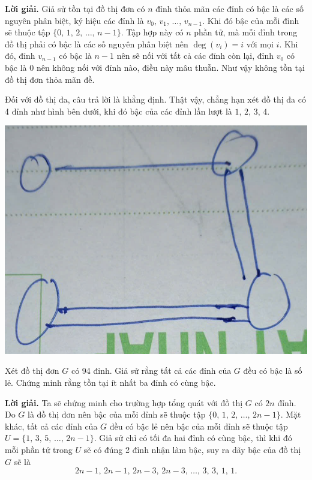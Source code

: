 \textbf{Lời giải. }Giả sử tồn tại đồ thị đơn có $n$ đỉnh thỏa mãn các đỉnh có bậc là các số nguyên phân biệt, ký hiệu các đỉnh là $v_0,\,v_1,\,\ldots,\,v_{n-1}$. Khi đó bậc của mỗi đỉnh sẽ thuộc tập $\{0,\,1,\,2,\,\ldots,\,n-1\}$. Tập hợp này có $n$ phần tử, mà mỗi đỉnh trong đồ thị phải có bậc là các số nguyên phân biệt nên $\deg(v_i) = i$ với mọi $i$. Khi đó, đỉnh $v_{n-1}$ có bậc là $n-1$ nên sẽ nối với tất cả các đỉnh còn lại, đỉnh $v_0$ có bậc là 0 nên không nối với đỉnh nào, điều này mâu thuẫn. Như vậy không tồn tại đồ thị đơn thỏa mãn đề.

Đối với đồ thị đa, câu trả lời là khẳng định. Thật vậy, chẳng hạn xét đồ thị đa có 4 đỉnh như hình bên dưới, khi đó bậc của các đỉnh lần lượt là $1,\,2,\,3,\,4$. 

\begin{center}
    \includegraphics[scale=0.3]{Figures/A_03_01_01.png}
\end{center}

\begin{tcolorbox}[breakable]
    \begin{baitoan}\label{pb:w02:05}
        Xét đồ thị đơn $G$ có 94 đỉnh. Giả sử rằng tất cả các đỉnh của $G$ đều có bậc là số lẻ. Chứng minh rằng tồn tại ít nhất ba đỉnh có cùng bậc.
    \end{baitoan}
\end{tcolorbox}

\textbf{Lời giải. }Ta sẽ chứng minh cho trường hợp tổng quát với đồ thị $G$ có $2n$ đỉnh. Do $G$ là đồ thị đơn nên bậc của mỗi đỉnh sẽ thuộc tập $\{0,\,1,\,2,\,\ldots,\,2n-1\}$. Mặt khác, tất cả các đỉnh của $G$ đều có bậc lẻ nên bậc của mỗi đỉnh sẽ thuộc tập $U = \{1,\,3,\,5,\,\ldots,\,2n-1\}$. Giả sử chỉ có tối đa hai đỉnh có cùng bậc, thì khi đó mỗi phần tử trong $U$ sẽ có đúng 2 đỉnh nhận làm bậc, suy ra dãy bậc của đồ thị $G$ sẽ là $$2n-1,\,2n-1,\,2n-3,\,2n-3,\,\ldots,\,3,\,3,\,1,\,1.$$

